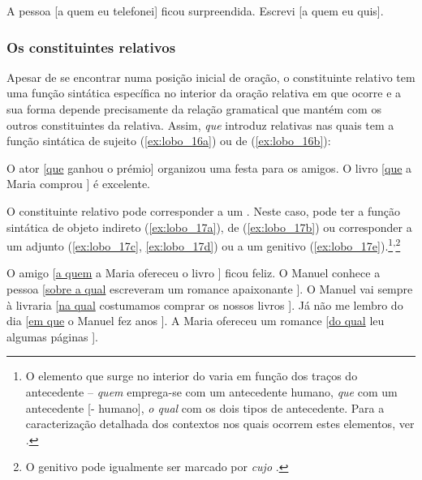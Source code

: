 \documentclass[output=paper]{LSP/langsci}
\begin{document}
\ea\label{ex:lobo_15}
\ea\label{ex:lobo_15a} A pessoa [a quem eu telefonei] ficou surpreendida.
\ex\label{ex:lobo_15b} Escrevi [a quem eu quis].
\zl

\subsubsection{Os constituintes relativos}
\label{subsubsec:lobo_cobstituintes_rel}

Apesar de se encontrar numa posição inicial de oração, o constituinte relativo tem uma função sintática específica no interior da oração relativa em que ocorre e a sua forma depende precisamente da relação gramatical que mantém com os outros constituintes da relativa. Assim, \textit{que} introduz relativas nas quais tem a função sintática de sujeito (\ref{ex:lobo_16a}) ou de  (\ref{ex:lobo_16b}):

\ea\label{ex:lobo_16}
\ea\label{ex:lobo_16a} O ator [\underline{que} \underline{\hspace{1em}} ganhou o prémio] organizou uma festa para os amigos.
\ex\label{ex:lobo_16b} O livro [\underline{que} a Maria comprou \underline{\hspace{1em}}] é excelente.
\zl

O constituinte relativo pode corresponder a um . Neste caso, pode ter a função sintática de objeto indireto (\ref{ex:lobo_17a}), de  (\ref{ex:lobo_17b}) ou corresponder a um adjunto (\ref{ex:lobo_17c}, \ref{ex:lobo_17d}) ou a um genitivo (\ref{ex:lobo_17e}).\footnote{O elemento que surge no interior do  varia em função dos traços do antecedente – \textit{quem} emprega-se com um antecedente humano, \textit{que} com um antecedente [- humano], \textit{o qual} com os dois tipos de antecedente. Para a caracterização detalhada dos contextos nos quais ocorrem estes elementos, ver \citealt{mateus_etal2003}.}\textsuperscript{,}\footnote{O genitivo pode igualmente ser marcado por \textit{cujo} \citep{mateus_etal2003}.}

\ea\label{ex:lobo_17}
\ea\label{ex:lobo_17a} O amigo [\underline{a quem} a Maria ofereceu o livro \underline{\hspace{1em}}] ficou feliz.
\ex\label{ex:lobo_17b} O Manuel conhece a pessoa [\underline{sobre a qual} escreveram um romance apaixonante \underline{\hspace{1em}}].
\ex\label{ex:lobo_17c} O Manuel vai sempre à livraria [\underline{na qual} costumamos comprar os nossos livros \underline{\hspace{1em}}].
\ex\label{ex:lobo_17d} Já não me lembro do dia [\underline{em que} o Manuel fez anos \underline{\hspace{1em}}].
\ex\label{ex:lobo_17e} A Maria ofereceu um romance [\underline{do qual} leu algumas páginas \underline{\hspace{1em}}].
\zl
\end{document}
